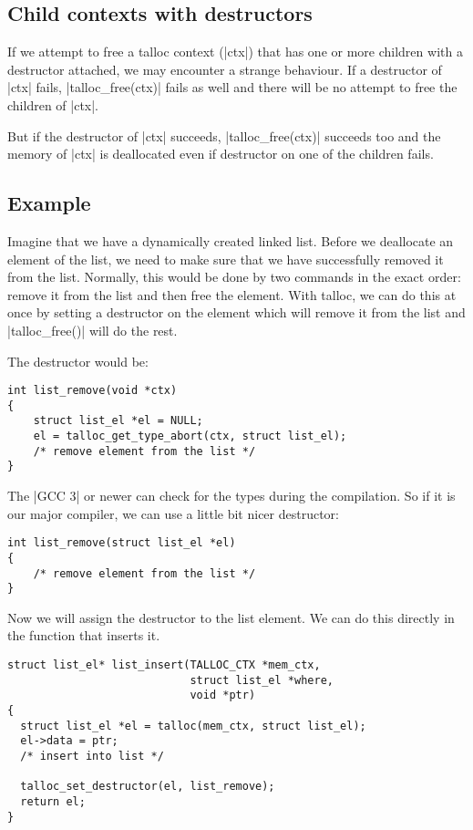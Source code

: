\subsection{Child contexts with destructors}

If we attempt to free a talloc context (|ctx|) that has one or more children
with a destructor attached, we may encounter a strange behaviour. If a
destructor of |ctx| fails, |talloc_free(ctx)| fails as well and there will
be no attempt to free the children of |ctx|.

But if the destructor of |ctx| succeeds, |talloc_free(ctx)| succeeds too and
the memory of |ctx| is deallocated even if destructor on one of the children
fails.

\subsection{Example}

Imagine that we have a dynamically created linked list. Before we deallocate an
element of the list, we need to make sure that we have successfully removed it
from the list. Normally, this would be done by two commands in the exact order:
remove it from the list and then free the element. With talloc, we can do this
at once by setting a destructor on the element which will remove it from the
list and |talloc_free()| will do the rest.

The destructor would be:

\begin{lstlisting}[caption={Remove an element from the list -- destructor}]
int list_remove(void *ctx)
{
    struct list_el *el = NULL;
    el = talloc_get_type_abort(ctx, struct list_el);
    /* remove element from the list */    
}
\end{lstlisting}

\noindent
The |GCC 3| or newer can check for the types during the compilation. So if it is
our major compiler, we can use a little bit nicer destructor:

\begin{lstlisting}[caption={Remove an element from the list -- type-safe
destructor}]
int list_remove(struct list_el *el)
{
    /* remove element from the list */    
}
\end{lstlisting}

\noindent
Now we will assign the destructor to the list element. We can do this directly
in the function that inserts it.

\begin{lstlisting}[caption={Remove an element from the list when freed},
morekeywords={talloc_set_destructor}]
struct list_el* list_insert(TALLOC_CTX *mem_ctx,
                            struct list_el *where,
                            void *ptr)
{
  struct list_el *el = talloc(mem_ctx, struct list_el);
  el->data = ptr;
  /* insert into list */
  
  talloc_set_destructor(el, list_remove);
  return el;
}
\end{lstlisting}

